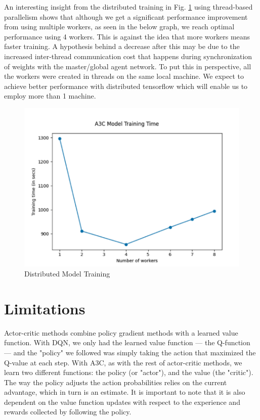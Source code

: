 \documentclass[conference]{IEEEtran}
\begin{document}
An interesting insight from the distributed training in Fig. \ref{multi_worker_graph} using thread-based parallelism shows that although we get a significant performance improvement from using multiple workers, as seen in the below graph, we reach optimal performance using 4 workers. This is against the idea that more workers means faster training. A hypothesis behind a decrease after this may be due to the increased inter-thread communication cost that happens during synchronization of weights with the master/global agent network. To put this in perspective, all the workers were created in threads on the same local machine. We expect to achieve better performance with distributed tensorflow which will enable us to employ more than 1 machine.

\begin{figure}[h!]
    \centering
    \includegraphics[width=\linewidth]{multi_worker.png}
    \caption{Distributed Model Training}
    \label{multi_worker_graph}
\end{figure}

\section{Limitations}

Actor-critic methods combine policy gradient methods with a learned value function. With DQN, we only had the learned value function — the Q-function — and the "policy" we followed was simply taking the action that maximized the Q-value at each step. With A3C, as with the rest of actor-critic methods, we learn two different functions: the policy (or "actor"), and the value (the "critic"). The way the policy adjusts the action probabilities relies on the current advantage, which in turn is an estimate. It is important to note that it is also dependent on the value function updates with respect to the experience and rewards collected by following the policy.
\end{document}
